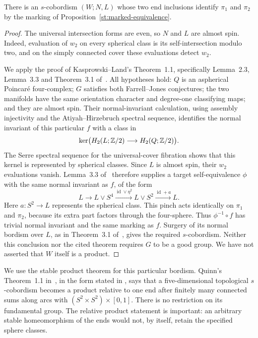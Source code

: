 \begin{lemma}\label{st:marked-bordism}
There is an $s$-cobordism $(W;N,L)$ whose two end inclusions identify
$\pi_1$ and $\pi_2$ by the marking of
Proposition~\ref{st:marked-equivalence}.
\end{lemma}

\begin{proof}
The universal intersection forms are even, so $N$ and $L$ are almost
spin.  Indeed, evaluation of $w_2$ on every spherical class is its
self-intersection modulo two, and on the simply connected cover these
evaluations detect $w_2$.

We apply the proof of Kasprowski--Land's Theorem~1.1, specifically
Lemma~2.3, Lemma~3.3 and Theorem~3.1 of~\cite{KL}.  All hypotheses hold:
$Q$ is an aspherical Poincar\'e four-complex; $G$ satisfies both
Farrell--Jones conjectures; the two manifolds have the same orientation
character and degree-one classifying maps; and they are almost spin.
Their normal-invariant calculation, using assembly injectivity and the
Atiyah--Hirzebruch spectral sequence, identifies the normal invariant of
this particular $f$ with a class in
\[
 \ker\bigl(H_2(L;\mathbb Z/2)\longrightarrow H_2(Q;\mathbb Z/2)\bigr).
\]
The Serre spectral sequence for the universal-cover fibration shows
that this kernel is represented by spherical classes. Since $L$ is
almost spin, their $w_2$ evaluations vanish. Lemma~3.3 of~\cite{KL}
therefore supplies a target self-equivalence $\phi$ with the same
normal invariant as $f$, of the form
\[
 L\longrightarrow L\vee S^4
 \xrightarrow{\operatorname{id}\vee\eta^2}L\vee S^2
 \xrightarrow{\operatorname{id}+a}L.
\]
Here $a:S^2\to L$ represents the spherical class. This pinch acts
identically on $\pi_1$ and $\pi_2$, because its extra part factors through
the four-sphere. Thus $\phi^{-1}\circ f$ has trivial normal invariant
and the same marking as $f$. Surgery of its normal bordism over $L$,
as in Theorem~3.1 of~\cite{KL}, gives the required $s$-cobordism.
Neither this conclusion nor
the cited theorem requires $G$ to be a good group.  We have not asserted
that $W$ itself is a product.
\end{proof}

We use the stable product theorem for this particular bordism.  Quinn's
Theorem~1.1 in~\cite{QuinnStable}, in the form stated in
\cite[Remark~3.7]{KPR}, says that a five-dimensional topological
$s$-cobordism becomes a product relative to one end after finitely many
connected sums along arcs with $(S^2\times S^2)\times[0,1]$.
There is no restriction on its fundamental group.  The relative product
statement is important: an arbitrary stable homeomorphism of the ends
would not, by itself, retain the specified sphere classes.

